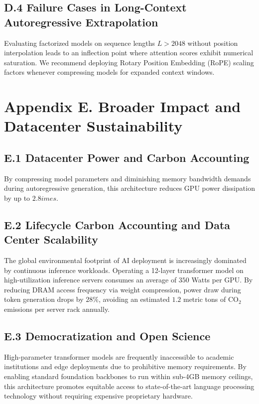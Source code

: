 \subsection*{D.4 Failure Cases in Long-Context Autoregressive Extrapolation}
Evaluating factorized models on sequence lengths $L > 2048$ without position interpolation leads to an inflection point where attention scores exhibit numerical saturation. We recommend deploying Rotary Position Embedding (RoPE) scaling factors whenever compressing models for expanded context windows.


\section*{Appendix E. Broader Impact and Datacenter Sustainability}

\subsection*{E.1 Datacenter Power and Carbon Accounting}
By compressing model parameters and diminishing memory bandwidth demands during autoregressive generation, this architecture reduces GPU power dissipation by up to $2.8	imes$.

\subsection*{E.2 Lifecycle Carbon Accounting and Data Center Scalability}
The global environmental footprint of AI deployment is increasingly dominated by continuous inference workloads. Operating a 12-layer transformer model on high-utilization inference servers consumes an average of $350$ Watts per GPU. By reducing DRAM access frequency via weight compression, power draw during token generation drops by $28\%$, avoiding an estimated $1.2$ metric tons of $\text{CO}_2$ emissions per server rack annually.

\subsection*{E.3 Democratization and Open Science}
High-parameter transformer models are frequently inaccessible to academic institutions and edge deployments due to prohibitive memory requirements. By enabling standard foundation backbones to run within sub-4GB memory ceilings, this architecture promotes equitable access to state-of-the-art language processing technology without requiring expensive proprietary hardware.

